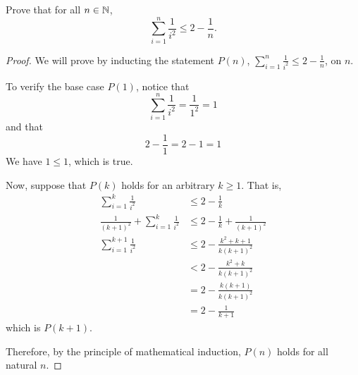 \documentclass{agony}
\begin{document}
\question Prove that for all $n\in\mathbb{N}$, \[ \sum_{i=1}^n \frac{1}{i^2} \leq 2-\frac{1}{n}. \]
\begin{proof}
  We will prove by inducting the statement $P(n)$, $\sum_{i=1}^n \frac{1}{i^2} \leq 2-\frac{1}{n}$, on $n$.

  To verify the base case $P(1)$, notice that
  \[ \sum_{i=1}^n \frac{1}{i^2} = \frac{1}{1^2} = 1 \]
  and that
  \[ 2-\frac{1}{1} = 2-1 = 1 \]
  We have $1 \leq 1$, which is true.

  Now, suppose that $P(k)$ holds for an arbitrary $k \geq 1$. That is,
  \begin{align*}
    \sum_{i=1}^k \frac{1}{i^2}                     & \leq 2-\frac{1}{k}                     \\
    \frac{1}{(k+1)^2} + \sum_{i=1}^k \frac{1}{i^2} & \leq 2-\frac{1}{k} + \frac{1}{(k+1)^2} \\
    \sum_{i=1}^{k+1} \frac{1}{i^2}                 & \leq 2-\frac{k^2+k+1}{k(k+1)^2}        \\
                                                   & < 2-\frac{k^2+k}{k(k+1)^2}             \\
                                                   & = 2-\frac{k(k+1)}{k(k+1)^2}            \\
                                                   & = 2-\frac{1}{k+1}
  \end{align*}
  which is $P(k+1)$.

  Therefore, by the principle of mathematical induction, $P(n)$ holds for all natural $n$.
\end{proof}
\end{document}
